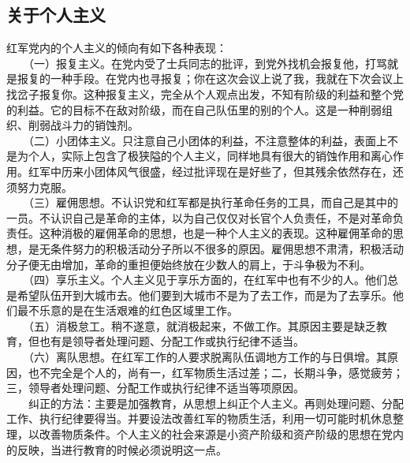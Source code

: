 \documentclass[cn,11pt,chinese]{elegantbook}
\def\myformat#1{\hfil\hfil #1}
\begin{document}
\subsection*{\myformat{关于个人主义}}
红军党内的个人主义的倾向有如下各种表现：\\
　　（一）报复主义。在党内受了士兵同志的批评，到党外找机会报复他，打骂就是报复的一种手段。在党内也寻报复；你在这次会议上说了我，我就在下次会议上找岔子报复你。这种报复主义，完全从个人观点出发，不知有阶级的利益和整个党的利益。它的目标不在敌对阶级，而在自己队伍里的别的个人。这是一种削弱组织、削弱战斗力的销蚀剂。\\
　　（二）小团体主义。只注意自己小团体的利益，不注意整体的利益，表面上不是为个人，实际上包含了极狭隘的个人主义，同样地具有很大的销蚀作用和离心作用。红军中历来小团体风气很盛，经过批评现在是好些了，但其残余依然存在，还须努力克服。\\
　　（三）雇佣思想。不认识党和红军都是执行革命任务的工具，而自己是其中的一员。不认识自己是革命的主体，以为自己仅仅对长官个人负责任，不是对革命负责任。这种消极的雇佣革命的思想，也是一种个人主义的表现。这种雇佣革命的思想，是无条件努力的积极活动分子所以不很多的原因。雇佣思想不肃清，积极活动分子便无由增加，革命的重担便始终放在少数人的肩上，于斗争极为不利。\\
　　（四）享乐主义。个人主义见于享乐方面的，在红军中也有不少的人。他们总是希望队伍开到大城市去。他们要到大城市不是为了去工作，而是为了去享乐。他们最不乐意的是在生活艰难的红色区域里工作。\\
　　（五）消极怠工。稍不遂意，就消极起来，不做工作。其原因主要是缺乏教育，但也有是领导者处理问题、分配工作或执行纪律不适当。\\
　　（六）离队思想。在红军工作的人要求脱离队伍调地方工作的与日俱增。其原因，也不完全是个人的，尚有一，红军物质生活过差；二，长期斗争，感觉疲劳；三，领导者处理问题、分配工作或执行纪律不适当等项原因。\\
　　纠正的方法：主要是加强教育，从思想上纠正个人主义。再则处理问题、分配工作、执行纪律要得当。并要设法改善红军的物质生活，利用一切可能时机休息整理，以改善物质条件。个人主义的社会来源是小资产阶级和资产阶级的思想在党内的反映，当进行教育的时候必须说明这一点。\\
\end{document}
